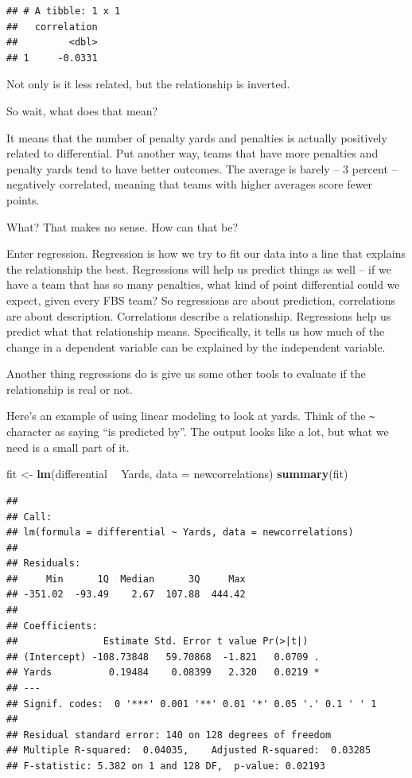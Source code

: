 \documentclass[]{book}
\newenvironment{Shaded}{\begin{snugshade}}{\end{snugshade}}
\newcommand{\DataTypeTok}[1]{\textcolor[rgb]{0.13,0.29,0.53}{#1}}
\newcommand{\KeywordTok}[1]{\textcolor[rgb]{0.13,0.29,0.53}{\textbf{#1}}}
\newcommand{\NormalTok}[1]{#1}
\newcommand{\OperatorTok}[1]{\textcolor[rgb]{0.81,0.36,0.00}{\textbf{#1}}}
\newcommand{\StringTok}[1]{\textcolor[rgb]{0.31,0.60,0.02}{#1}}
\begin{document}
\begin{verbatim}
## # A tibble: 1 x 1
##   correlation
##         <dbl>
## 1     -0.0331
\end{verbatim}

Not only is it less related, but the relationship is inverted.

So wait, what does that mean?

It means that the number of penalty yards and penalties is actually positively related to differential. Put another way, teams that have more penalties and penalty yards tend to have better outcomes. The average is barely -- 3 percent -- negatively correlated, meaning that teams with higher averages score fewer points.

What? That makes no sense. How can that be?

Enter regression. Regression is how we try to fit our data into a line that explains the relationship the best. Regressions will help us predict things as well -- if we have a team that has so many penalties, what kind of point differential could we expect, given every FBS team? So regressions are about prediction, correlations are about description. Correlations describe a relationship. Regressions help us predict what that relationship means. Specifically, it tells us how much of the change in a dependent variable can be explained by the independent variable.

Another thing regressions do is give us some other tools to evaluate if the relationship is real or not.

Here's an example of using linear modeling to look at yards. Think of the \texttt{\textasciitilde{}} character as saying ``is predicted by''. The output looks like a lot, but what we need is a small part of it.

\begin{Shaded}
\begin{Highlighting}[]
\NormalTok{fit <-}\StringTok{ }\KeywordTok{lm}\NormalTok{(differential }\OperatorTok{~}\StringTok{ }\NormalTok{Yards, }\DataTypeTok{data =}\NormalTok{ newcorrelations)}
\KeywordTok{summary}\NormalTok{(fit)}
\end{Highlighting}
\end{Shaded}

\begin{verbatim}
## 
## Call:
## lm(formula = differential ~ Yards, data = newcorrelations)
## 
## Residuals:
##     Min      1Q  Median      3Q     Max 
## -351.02  -93.49    2.67  107.88  444.42 
## 
## Coefficients:
##               Estimate Std. Error t value Pr(>|t|)  
## (Intercept) -108.73848   59.70868  -1.821   0.0709 .
## Yards          0.19484    0.08399   2.320   0.0219 *
## ---
## Signif. codes:  0 '***' 0.001 '**' 0.01 '*' 0.05 '.' 0.1 ' ' 1
## 
## Residual standard error: 140 on 128 degrees of freedom
## Multiple R-squared:  0.04035,    Adjusted R-squared:  0.03285 
## F-statistic: 5.382 on 1 and 128 DF,  p-value: 0.02193
\end{verbatim}
\end{document}
